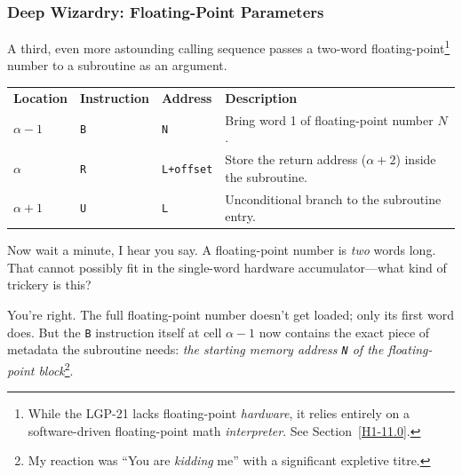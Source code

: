 \subsubsection*{Deep Wizardry: Floating-Point Parameters}

A third, even more astounding calling sequence passes a two-word floating-point\footnote{While the LGP-21 lacks floating-point \emph{hardware}, it relies entirely on a software-driven floating-point math \emph{interpreter}. See Section~\ref{H1-11.0}.} number to a subroutine as an argument.

\begin{center}
\begin{tabularx}{\textwidth}{lllX}
\textbf{Location} & \textbf{Instruction} & \textbf{Address} & \textbf{Description} \\
$\alpha-1$  & \texttt{B} & \texttt{N}        & Bring word 1 of floating-point number $N$. \\
$\alpha$    & \texttt{R} & \texttt{L+offset} & Store the return address ($\alpha+2$) inside the subroutine. \\
$\alpha+1$  & \texttt{U} & \texttt{L}        & Unconditional branch to the subroutine entry. \\
\end{tabularx}
\end{center}

Now wait a minute, I hear you say. A floating-point number is \emph{two} words long. That cannot possibly fit in the single-word hardware accumulator—what kind of trickery is this?

You're right. The full floating-point number doesn't get loaded; only its first word does. But the \texttt{B} instruction itself at cell $\alpha-1$ now contains the exact piece of metadata the subroutine needs: \emph{the starting memory address \texttt{N} of the floating-point block}\footnote{My reaction was ``You are \emph{kidding} me'' with a significant expletive titre.}. 

